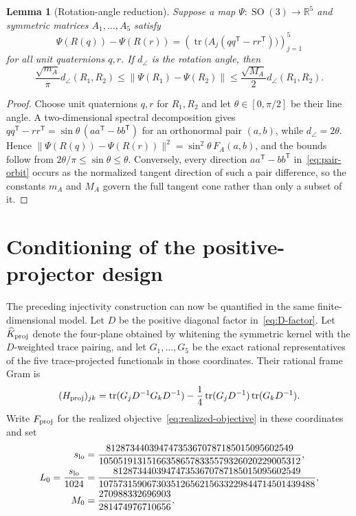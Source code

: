 \documentclass[12pt]{article}
\newtheorem{lemma}[theorem]{Lemma}
\theoremstyle{definition}
\theoremstyle{remark}
\newcommand{\RR}{\mathbb R}
\newcommand{\SO}{\operatorname{SO}}
\newcommand{\tr}{\operatorname{tr}}
\begin{document}
\begin{lemma}[Rotation-angle reduction]\label{lem:angle-reduction}
Suppose a map $\Psi:\SO(3)\to\RR^5$ and symmetric matrices
$A_1,\ldots,A_5$ satisfy
\begin{equation}\label{eq:coordinate-difference-identity}
 \Psi(R(q))-\Psi(R(r))
 =\left(\tr\!\bigl(A_j(qq^{\mathsf T}-rr^{\mathsf T})\bigr)\right)_{j=1}^5
\end{equation}
for all unit quaternions $q,r$.  If $d_\angle$ is the rotation angle, then
\begin{equation}\label{eq:generic-angle-reduction}
 \frac{\sqrt{m_A}}{\pi}d_\angle(R_1,R_2)
 \leq\|\Psi(R_1)-\Psi(R_2)\|
 \leq\frac{\sqrt{M_A}}2d_\angle(R_1,R_2).
\end{equation}
\end{lemma}

\begin{proof}
Choose unit quaternions $q,r$ for $R_1,R_2$ and let
$\theta\in[0,\pi/2]$ be their line angle.  A two-dimensional spectral
decomposition gives
 $qq^{\mathsf T}-rr^{\mathsf T}=\sin\theta\,(aa^{\mathsf T}-bb^{\mathsf T})$
 for an orthonormal pair $(a,b)$, while $d_\angle=2\theta$.  Hence
 $\|\Psi(R(q))-\Psi(R(r))\|^2=\sin^2\theta\,F_A(a,b)$, and the bounds follow
 from $2\theta/\pi\leq\sin\theta\leq\theta$.  Conversely, every direction
 $aa^{\mathsf T}-bb^{\mathsf T}$ in~\eqref{eq:pair-orbit} occurs as the
 normalized tangent direction of such a pair difference, so the constants
 $m_A$ and $M_A$ govern the full tangent cone rather than only a subset of it.
\end{proof}

\section{Conditioning of the positive-projector design}
\label{sec:projector-conditioning}

The preceding injectivity construction can now be quantified in the same
finite-dimensional model.  Let $D$ be the positive diagonal factor
in~\eqref{eq:D-factor}.  Let $\widehat K_{\rm proj}$ denote the
four-plane obtained by whitening the symmetric kernel with the $D$-weighted
trace pairing, and let $G_1,\ldots,G_5$ be the exact rational representatives
of the five trace-projected functionals in those coordinates.  Their rational
frame Gram is
\begin{equation}\label{eq:projector-frame-gram}
 (H_{\rm proj})_{jk}=\tr(G_jD^{-1}G_kD^{-1})
 -\frac14\tr(G_jD^{-1})\tr(G_kD^{-1}).
\end{equation}
Write $F_{\rm proj}$ for the realized objective~\eqref{eq:realized-objective}
in these coordinates and set
\begin{align}
 s_{\rm lo}
 &=\frac{812873440394747353670787185015095602549}
 {105051913151663586578335579326020229005312},\label{eq:slo}\\
 L_0=\frac{s_{\rm lo}}{1024}
 &=\frac{812873440394747353670787185015095602549}
 {107573159067303512656215633229844714501439488},\label{eq:L0}\\
 M_0&=\frac{270988332696903}{281474976710656}.\label{eq:M0}
\end{align}
\end{document}
